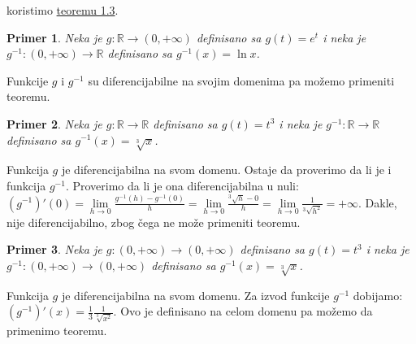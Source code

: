 \documentclass{article}
\newtheorem{prim}{Primer}[section]
\begin{document}
koristimo \hyperref[teorema_1.3]{teoremu 1.3}.\par
\begin{primbox}
    \begin{prim}
        Neka je $g: \mathbb{R} \longrightarrow (0, +\infty)$ definisano sa
        $g(t) = e^t$ i neka je $g^{-1}:(0, +\infty)\longrightarrow \mathbb{R}$
        definisano sa $g^{-1}(x) = \ln{x}$.
    \end{prim}
    Funkcije $g$ i $g^{-1}$
    su diferencijabilne na svojim domenima pa možemo primeniti teoremu.
\end{primbox}
\begin{primbox}
    \begin{prim}
        Neka je $g:\mathbb{R}\longrightarrow\mathbb{R}$
        definisano sa $g(t) = t^3$ i neka je $g^{-1}:\mathbb{R}\longrightarrow\mathbb{R}$
        definisano sa $g^{-1}(x) = \sqrt[3]{x}$.
    \end{prim}
    Funkcija $g$ je diferencijabilna
    na svom domenu. Ostaje da proverimo da li je i funkcija $g^{-1}$. Proverimo da li je ona diferencijabilna u nuli:
    $(g^{-1})'(0) = \lim\limits_{h\longrightarrow 0}\frac{g^{-1}(h) - g^{-1}(0)}{h} = \lim\limits_{h\longrightarrow 0}\frac{^3\sqrt{h} - 0}{h} = \lim\limits_{h\longrightarrow 0}\frac{1}{^3\sqrt{h^2}} = +\infty$.
    Dakle, nije diferencijabilno, zbog čega ne može primeniti teoremu.\par
\end{primbox}
\begin{primbox}
    \begin{prim}
        Neka je $g: (0, +\infty) \longrightarrow (0, +\infty)$
        definisano sa $ g(t) = t^3$ i neka je $g^{-1}: (0,+\infty)\longrightarrow(0,+\infty)$
        definisano sa $ g^{-1}(x) = \sqrt[3]{x}$.
    \end{prim}
    Funkcija $g$ je diferencijabilna na svom domenu.
    Za izvod funkcije $g^{-1}$ dobijamo: $(g^{-1})'(x) = \frac{1}{3}\frac{1}{\sqrt[3]{x^2}}$.
    Ovo je definisano na celom domenu pa možemo da primenimo teoremu.\par
\end{primbox}
\end{document}
